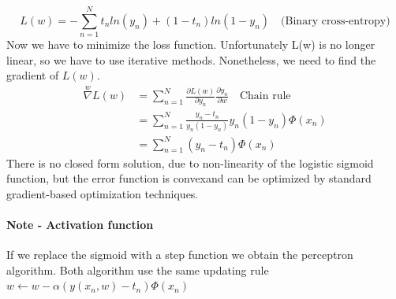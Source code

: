 \documentclass[../main.tex]{subfiles}
\begin{document}
\begin{equation}
    L(w) = -\sum_{n=1}^N t_n ln(y_n) + (1 - t_n)ln(1 - y_n) \quad \text{(Binary cross-entropy)}
\end{equation}
Now we have to minimize the loss function. Unfortunately L(w) is no longer linear, so we have to use iterative methods. Nonetheless, we need to find the gradient of $L(w)$.
\begin{align*}
    \overset{w}{\nabla} L(w) & = \sum_{n=1}^N \frac{\partial L(w)}{\partial y_n} \frac{\partial y_n}{\partial w} \quad \text{Chain rule} \\
                             & = \sum_{n=1}^N \frac{y_n - t_n}{y_n (1 - y_n)} y_n(1-y_n)\Phi(x_n)                                        \\
                             & = \sum_{n=1}^N (y_n - t_n)\Phi(x_n)
\end{align*}
There is no closed form solution, due to non-linearity of the logistic sigmoid function, but the error function is convex\footnotemark and can be optimized by standard gradient-based optimization techniques. 

\paragraph{Note - Activation function} If we replace the sigmoid with a step function we obtain the perceptron algorithm. Both algorithm use the same updating rule $w \leftarrow w - \alpha(y(x_n, w)-t_n)\Phi(x_n)$
\end{document}
